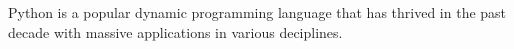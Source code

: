 

\begin{enabstract}

Python is a popular dynamic programming language that has thrived in the past decade with massive applications in various deciplines.


\end{enabstract}
